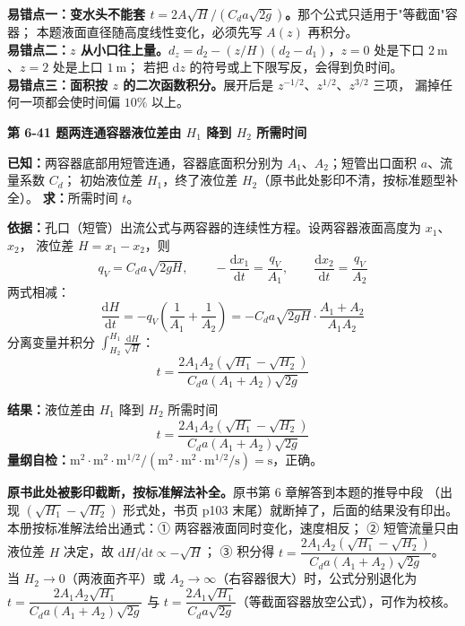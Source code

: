 \begin{yicuo}
\textbf{易错点一：变水头不能套 $t=2A\sqrt{H}/(C_da\sqrt{2g})$。}那个公式只适用于"等截面"容器；
本题液面直径随高度线性变化，必须先写 $A(z)$ 再积分。\\
\textbf{易错点二：$z$ 从小口往上量。}$d_z=d_2-(z/H)(d_2-d_1)$，$z=0$ 处是下口 $2\ \mathrm{m}$、$z=2$ 处是上口 $1\ \mathrm{m}$；
若把 $\mathrm dz$ 的符号或上下限写反，会得到负时间。\\
\textbf{易错点三：面积按 $z$ 的二次函数积分。}展开后是 $z^{-1/2}$、$z^{1/2}$、$z^{3/2}$ 三项，
漏掉任何一项都会使时间偏 $10\%$ 以上。
\end{yicuo}

\noindent\textbf{第 6-41 题\quad 两连通容器液位差由 $H_1$ 降到 $H_2$ 所需时间}

\begin{jie}
\textbf{已知：}两容器底部用短管连通，容器底面积分别为 $A_1$、$A_2$；短管出口面积 $a$、流量系数 $C_d$；
初始液位差 $H_1$，终了液位差 $H_2$（原书此处影印不清，按标准题型补全）。
\textbf{求：}所需时间 $t$。

\textbf{依据：}孔口（短管）出流公式与两容器的连续性方程。设两容器液面高度为 $x_1$、$x_2$，
液位差 $H=x_1-x_2$，则
\[ q_V=C_da\sqrt{2gH},\qquad -\frac{\mathrm dx_1}{\mathrm dt}=\frac{q_V}{A_1},\qquad
\frac{\mathrm dx_2}{\mathrm dt}=\frac{q_V}{A_2} \]
两式相减：
\[ \frac{\mathrm dH}{\mathrm dt}=-q_V\left(\frac{1}{A_1}+\frac{1}{A_2}\right)
=-C_da\sqrt{2gH}\cdot\frac{A_1+A_2}{A_1A_2} \]
分离变量并积分 $\displaystyle\int_{H_2}^{H_1}\frac{\mathrm dH}{\sqrt H}$：
\[ t=\frac{2A_1A_2\left(\sqrt{H_1}-\sqrt{H_2}\right)}{C_da\left(A_1+A_2\right)\sqrt{2g}} \]

\textbf{结果：}液位差由 $H_1$ 降到 $H_2$ 所需时间
\[ \boxed{\,t=\frac{2A_1A_2\left(\sqrt{H_1}-\sqrt{H_2}\right)}{C_da\left(A_1+A_2\right)\sqrt{2g}}\,} \]
\textbf{量纲自检：}$\mathrm{m^2\cdot m^2\cdot m^{1/2}/(m^2\cdot m^2\cdot m^{1/2}/s)}=\mathrm{s}$，正确。
\end{jie}

\begin{tishi}
\textbf{原书此处被影印截断，按标准解法补全。}原书第 6 章解答到本题的推导中段
（出现 $(\sqrt{H_1}-\sqrt{H_2})$ 形式处，书页 p103 末尾）就断掉了，后面的结果没有印出。
本册按标准解法给出通式：① 两容器液面同时变化，速度相反；
② 短管流量只由液位差 $H$ 决定，故 $\mathrm dH/\mathrm dt\propto-\sqrt H$；
③ 积分得 $t=\dfrac{2A_1A_2(\sqrt{H_1}-\sqrt{H_2})}{C_da(A_1+A_2)\sqrt{2g}}$。
当 $H_2\to0$（两液面齐平）或 $A_2\to\infty$（右容器很大）时，公式分别退化为
$t=\dfrac{2A_1A_2\sqrt{H_1}}{C_da(A_1+A_2)\sqrt{2g}}$ 与 $t=\dfrac{2A_1\sqrt{H_1}}{C_da\sqrt{2g}}$（等截面容器放空公式），可作为校核。
\end{tishi}

